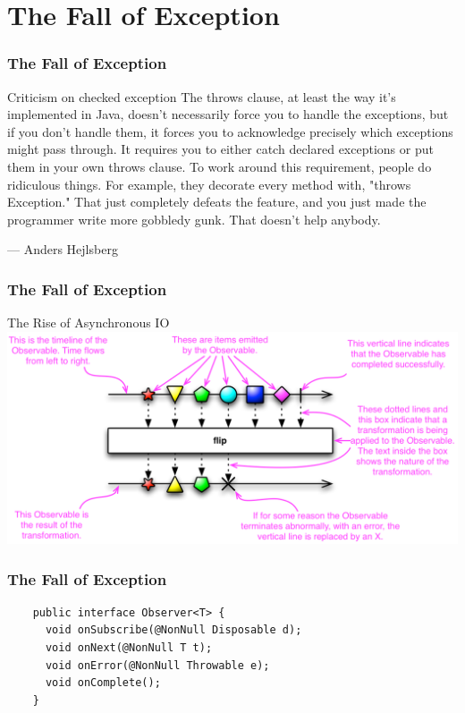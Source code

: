 \documentclass[lualatex]{beamer}
\begin{document}
\section{The Fall of Exception}

\begin{frame}
  \frametitle{The Fall of Exception}

  \begin{block}{Criticism on checked exception}
    The throws clause, at least the way it's implemented in Java, doesn't necessarily force you to handle the exceptions,
    but if you don't handle them, it forces you to acknowledge precisely which exceptions might pass through.
    It requires you to either catch declared exceptions or put them in your own throws clause.
    To work around this requirement, people do ridiculous things.
    For example, they decorate every method with, "throws Exception."
    That just completely defeats the feature, and you just made the programmer write more gobbledy gunk.
    That doesn't help anybody.

    \hfill --- Anders Hejlsberg
  \end{block}
\end{frame}

\begin{frame}
  \frametitle{The Fall of Exception}
  \begin{block}{The Rise of Asynchronous IO}
    \includegraphics[width=\textwidth]{legend.png}
  \end{block}
\end{frame}

\begin{frame}[fragile]
  \frametitle{The Fall of Exception}

  \begin{verbatim}
    public interface Observer<T> {
      void onSubscribe(@NonNull Disposable d);
      void onNext(@NonNull T t);
      void onError(@NonNull Throwable e);
      void onComplete();
    }
  \end{verbatim}
\end{frame}
\end{document}
